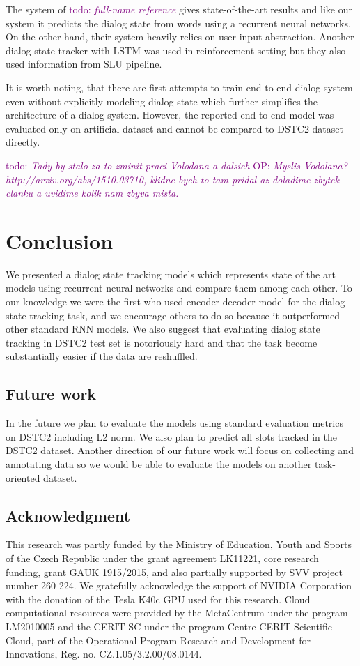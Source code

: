 \documentclass{itatnew}
\def\OP#1{\textcolor{purple}{OP: \textit{#1}}}
\def\PB#1{\textcolor{red}{PB: \textit{#1}}}
\def\todo#1{\textcolor{purple}{todo: \textit{#1}}}
\begin{document}
The system of \cite{henderson2014word}\todo{full-name reference} gives state-of-the-art results and like our system it predicts the dialog state from words using a recurrent neural networks.
On the other hand, their system heavily relies on user input abstraction.
Another dialog state tracker with LSTM was used in reinforcement setting but they also used information from SLU pipeline.\cite{lee2016dialog}

It is worth noting, that there are first attempts to train end-to-end dialog system even without explicitly modeling dialog state\cite{bordes2016learning} which further simplifies the architecture of a dialog system.
However, the reported end-to-end model was evaluated only on artificial dataset and cannot be compared to DSTC2 dataset directly.

\todo{Tady by stalo za to zminit praci Volodana a dalsich}
\OP{Myslis Vodolana? http://arxiv.org/abs/1510.03710, klidne bych to tam pridal az doladime zbytek clanku a uvidime kolik nam zbyva mista.}

\section{Conclusion}
\label{sec:conc}

We presented a dialog state tracking models which represents state of the art models using recurrent neural networks and compare them among each other.
To our knowledge we were the first who used encoder-decoder model for the dialog state tracking task, and we encourage others to do so because it outperformed other standard RNN models.
We also suggest that evaluating dialog state tracking in DSTC2 test set is notoriously hard and that the task become substantially easier if the data are reshuffled.

\subsection*{Future work}
In the future we plan to evaluate the models using standard evaluation metrics on DSTC2 including L2 norm.
We also plan to predict all slots tracked in the DSTC2 dataset.
Another direction of our future work will focus on collecting and annotating data so we would be able to evaluate the models on another task-oriented dataset.


\subsection*{Acknowledgment}
This research was partly funded by the Ministry of Education, Youth and Sports of the Czech Republic under the grant agreement LK11221, core research funding, grant GAUK 1915/2015, and also partially supported by SVV project number 260 224. 
We gratefully acknowledge the support of NVIDIA Corporation with the donation of the Tesla K40c GPU used for this research.
Cloud computational resources were provided by the MetaCentrum under the program LM2010005 and the CERIT-SC under the program Centre CERIT Scientific Cloud, part of the Operational Program Research and Development for Innovations, Reg. no. CZ.1.05/3.2.00/08.0144.
\end{document}
